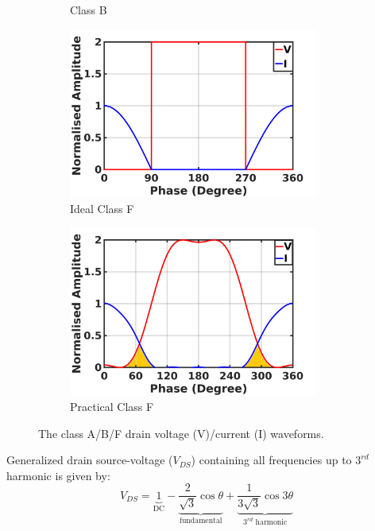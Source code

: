 \documentclass[conference]{IEEEtran}
\begin{document}
\begin{figure}[!t]
\begin{subfigure}{0.24\textwidth}
\caption{Class B}
\label{fig:CB_wave_VI}
\end{subfigure}
\begin{subfigure}{0.24\textwidth}
\includegraphics[width=0.9\textwidth]{Images/Intro/ClassF.jpg}
\caption{Ideal Class F}
\label{fig:ICF_wave_VI}
\end{subfigure}
\begin{subfigure}{0.24\textwidth}
\includegraphics[width=0.9\textwidth]{Images/Intro/CF_wave_VI_shaded.jpg}
\caption{Practical Class F}
\label{fig:CF_wave_VI}
\end{subfigure}
\caption{The class A/B/F drain  voltage (V)/current (I) waveforms. \color{black}}
\label{fig:wave_VI}
\vspace{-0.25in}
\end{figure}
Generalized drain source\color{blue}-\color{black}voltage ($V_{DS}$) containing all frequencies up to $3^{rd}$ harmonic \cite{Gen_Vds_eqn} is given by:
\begin{equation}
V_{DS}=\underbrace{1}_{\text{DC}}-\underbrace{\frac{2}{\sqrt{3}} \cos \theta}_{\text{fundamental}}+\underbrace{\frac{1}{3 \sqrt{3}} \cos 3 \theta}_{\text{$3^{rd}$ harmonic}}
\label{eqn_CF_V}
\end{equation}
\end{document}
